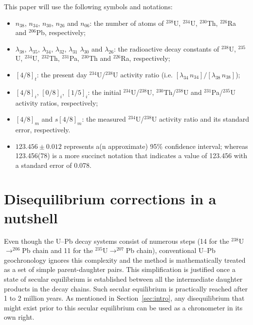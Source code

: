 \documentclass{article}
\begin{document}
This paper will use the following symbols and notations:
\begin{itemize}
\item{$n_{38}$, $n_{34}$, $n_{30}$, $n_{26}$ and $n_{06}$}: the number
  of atoms of ${}^{238}$U, ${}^{234}$U, ${}^{230}$Th, ${}^{226}$Ra and
  ${}^{206}$Pb, respectively;
\item{$\lambda_{38}$, $\lambda_{35}$, $\lambda_{34}$, $\lambda_{32}$, $\lambda_{31}$ 
  $\lambda_{30}$ and $\lambda_{26}$}: the radioactive decay constants
  of ${}^{238}$U, ${}^{235}$U, ${}^{234}$U, ${}^{232}$Th, ${}^{231}$Pa, ${}^{230}$Th
  and ${}^{226}$Ra, respectively;
\item{$[4/8]_t$}: the present day ${}^{234}$U/${}^{238}$U activity
  ratio (i.e. $[\lambda_{34}\,n_{34}]/[\lambda_{38}\,n_{38}]$);
\item{$[4/8]_i$, $[0/8]_i$, $[1/5]_i$}: the initial
  ${}^{234}$U/${}^{238}$U, ${}^{230}$Th/${}^{238}$U and
  ${}^{231}$Pa/${}^{235}$U activity ratios, respectively;
\item{$[4/8]_m$ and $s[4/8]_m$}: the measured
  ${}^{234}$U/${}^{238}$U activity ratio and its standard error,
  respectively.
\item{$123.456 \pm 0.012$ represents a(n approximate) 95\% confidence
  interval; whereas 123.456(78) is a more succinct notation that
  indicates a value of 123.456 with a standard error of 0.078.}
\end{itemize}

\section{Disequilibrium corrections in a nutshell}\label{sec:diseq}

Even though the U--Pb decay systems consist of numerous steps (14 for
the $^{238}$U$\rightarrow^{206}$Pb chain and 11 for the
$^{235}$U$\rightarrow^{207}$Pb chain), conventional U--Pb
geochronology ignores this complexity and the method is mathematically
treated as a set of simple parent-daughter pairs.  This simplification
is justified once a state of secular equilibrium is established
between all the intermediate daughter products in the decay chains.
Such secular equilibrium is practically reached after 1 to 2 million
years.  As mentioned in Section~\ref{sec:intro}, any disequilibrium
that might exist prior to this secular equilibrium can be used as a
chronometer in its own right.\medskip
\end{document}
